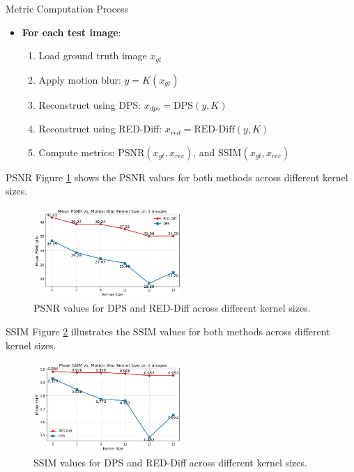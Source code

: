 \begin{frame}{Metric Computation Process}
    \begin{itemize}
        \item \textbf{For each test image}:
              \begin{enumerate}
                  \item Load ground truth image $x_{gt}$
                  \item Apply motion blur: $y = K(x_{gt})$
                  \item Reconstruct using DPS: $x_{dps} = \text{DPS}(y, K)$
                  \item Reconstruct using RED-Diff: $x_{red} = \text{RED-Diff}(y, K)$
                  \item Compute metrics: $\text{PSNR}(x_{gt}, x_{rec})$, and $\text{SSIM}(x_{gt}, x_{rec})$
              \end{enumerate}
    \end{itemize}
\end{frame}

\begin{frame}{PSNR}
    Figure \ref{fig:psnr_results} shows the PSNR values for both methods across different kernel sizes.
    \begin{figure}
        \centering
        \includegraphics[width=0.5\textwidth]{media/mean_psnr_over_kernels.png}
        \caption{PSNR values for DPS and RED-Diff across different kernel sizes.}
        \label{fig:psnr_results}
    \end{figure}
\end{frame}

\begin{frame}{SSIM}
    Figure \ref{fig:ssim_results} illustrates the SSIM values for both methods across different kernel sizes.
    \begin{figure}
        \centering
        \includegraphics[width=0.5\textwidth]{media/mean_ssim_over_kernels.png}
        \caption{SSIM values for DPS and RED-Diff across different kernel sizes.}
        \label{fig:ssim_results}
    \end{figure}
\end{frame}

